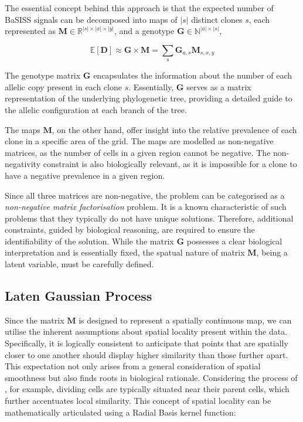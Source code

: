 The essential concept behind this approach is that the expected number of \ac{BaSISS} signals can be decomposed into maps of $|s|$ distinct clones $s$, each represented as $\mathbf{M} \in \mathbb{R}^{|s| \times |x| \times |y|}$, and a genotype $\mathbf{G} \in \mathbb{N}^{|a| \times |s|}$,

\begin{equation}
    \mathbb{E}[\mathbf{D}] \approx \mathbf{G} \times \mathbf{M} = \sum_{s} \mathbf{G}_{a, s} \mathbf{M}_{s, x, y}
    \label{eq:ED}
\end{equation}

The genotype matrix $\mathbf{G}$ encapsulates the information about the number of each allelic copy present in each clone $s$. Essentially, $\mathbf{G}$ serves as a matrix representation of the underlying phylogenetic tree, providing a detailed guide to the allelic configuration at each branch of the tree. 

The maps $\mathbf{M}$, on the other hand, offer insight into the relative prevalence of each clone in a specific area of the grid. The maps are modelled as non-negative matrices, as the number of cells in a given region cannot be negative. The non-negativity constraint is also biologically relevant, as it is impossible for a clone to have a negative prevalence in a given region.

Since all three matrices are non-negative, the problem can be categorised as a \emph{non-negative matrix factorisation} problem. It is a known characteristic of such problems that they typically do not have unique solutions. Therefore, additional constraints, guided by biological reasoning, are required to ensure the identifiability of the solution. While the matrix $\mathbf{G}$ possesses a clear biological interpretation and is essentially fixed, the spatual nature of matrix $\mathbf{M}$, being a latent variable, must be carefully defined.

\subsection{Laten Gaussian Process}

Since the matrix $\mathbf{M}$ is designed to represent a spatially continuous map, we can utilise the inherent assumptions about spatial locality present within the data. Specifically, it is logically consistent to anticipate that points that are spatially closer to one another should display higher similarity than those further apart. This expectation not only arises from a general consideration of spatial smoothness but also finds roots in biological rationale. Considering the process of , for example, dividing cells are typically situated near their parent cells, which further accentuates local similarity. This concept of spatial locality can be mathematically articulated using a Radial Basis kernel function:

